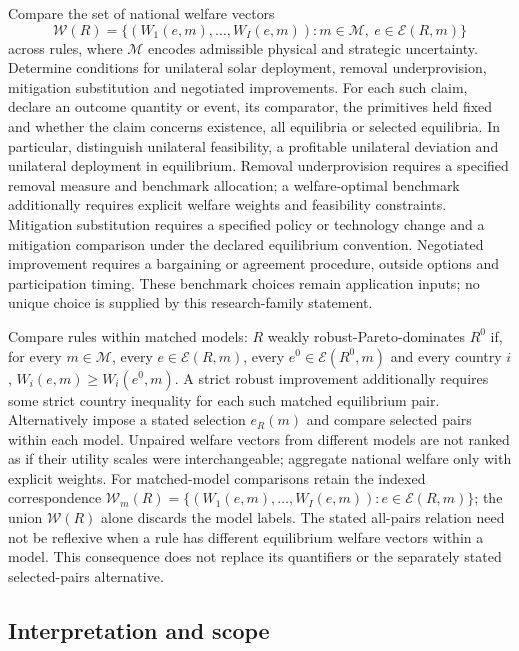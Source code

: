 \documentclass[11pt,a4paper]{article}
\begin{document}
Compare the set of national welfare vectors
\[
\mathcal W(R)=
\{(W_1(e,m),\ldots,W_I(e,m)):
m\in\mathcal M,\ e\in\mathcal E(R,m)\}
\]
across rules, where $\mathcal M$ encodes admissible physical and strategic uncertainty. Determine conditions for unilateral solar deployment, removal underprovision, mitigation substitution and negotiated improvements. For each such claim, declare an outcome quantity or event, its comparator, the primitives held fixed and whether the claim concerns existence, all equilibria or selected equilibria. In particular, distinguish unilateral feasibility, a profitable unilateral deviation and unilateral deployment in equilibrium. Removal underprovision requires a specified removal measure and benchmark allocation; a welfare-optimal benchmark additionally requires explicit welfare weights and feasibility constraints. Mitigation substitution requires a specified policy or technology change and a mitigation comparison under the declared equilibrium convention. Negotiated improvement requires a bargaining or agreement procedure, outside options and participation timing. These benchmark choices remain application inputs; no unique choice is supplied by this research-family statement.

Compare rules within matched models: $R$ weakly robust-Pareto-dominates $R^0$ if, for every $m\in\mathcal M$, every $e\in\mathcal E(R,m)$, every $e^0\in\mathcal E(R^0,m)$ and every country $i$, $W_i(e,m)\ge W_i(e^0,m)$. A strict robust improvement additionally requires some strict country inequality for each such matched equilibrium pair. Alternatively impose a stated selection $e_R(m)$ and compare selected pairs within each model. Unpaired welfare vectors from different models are not ranked as if their utility scales were interchangeable; aggregate national welfare only with explicit weights. For matched-model comparisons retain the indexed correspondence $\mathcal W_m(R)=\{(W_1(e,m),\ldots,W_I(e,m)):e\in\mathcal E(R,m)\}$; the union $\mathcal W(R)$ alone discards the model labels. The stated all-pairs relation need not be reflexive when a rule has different equilibrium welfare vectors within a model. This consequence does not replace its quantifiers or the separately stated selected-pairs alternative.

\subsection*{Interpretation and scope}
\end{document}
